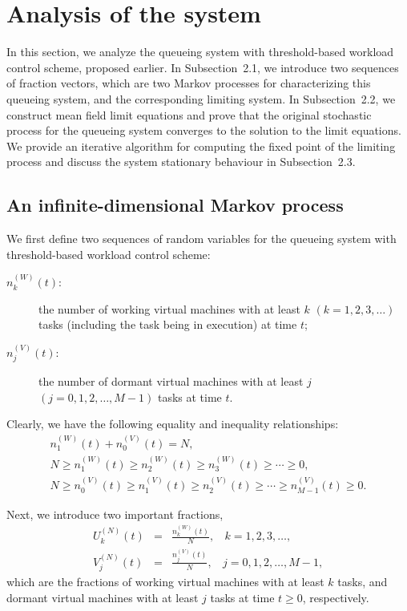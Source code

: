 \documentclass[12pt]{article}
\begin{document}
\section{Analysis of the system}

In this section, we analyze the queueing system with threshold-based workload control scheme, proposed earlier. In Subsection~2.1, we introduce two sequences of fraction vectors, which are two Markov processes for characterizing this queueing system, and the corresponding limiting system. In Subsection~2.2, we construct mean field limit equations and prove that the original stochastic process for the queueing system converges to the solution to the limit equations. We provide an iterative algorithm for computing the fixed point of the limiting process and discuss the system stationary behaviour in Subsection~2.3.


\subsection{An infinite-dimensional Markov process}

We first define two sequences of random variables for the queueing system with threshold-based workload control scheme:
\begin{description}
 \item[$n_k^{(W)}(t)$:] the number of working virtual machines with at least $k$ $(k=1,2,3,\ldots)$ tasks (including the task being in execution) at time $t$;
  \item[$n_j^{(V)}(t)$:] the number of dormant virtual machines with at least $j$ $(j=0,1,2,\ldots, M-1)$ tasks at time $t$.
\end{description}
Clearly, we have the following equality and inequality relationships:
\[\begin{array}{c}
 \displaystyle n_1^{(W)}(t)+n_0^{(V)}(t)=N, \\[4mm]
 \displaystyle N\geq n_1^{(W)}(t)\geq n_2^{(W)}(t)\geq n_3^{(W)}(t)\geq \cdots\geq 0, \\[4mm]
 \displaystyle N\geq n_0^{(V)}(t)\geq n_1^{(V)}(t)\geq n_2^{(V)}(t)\geq \cdots \geq n_{M-1}^{(V)}(t)\geq 0.
\end{array}\]

Next, we introduce two important fractions,
\begin{eqnarray*}
 \displaystyle U^{(N)}_{k}(t) &=& \frac{n_k^{(W)}(t)}{N},~~~~ k=1,2,3,\ldots, \\[4mm]
\displaystyle  V^{(N)}_{j}(t) &=& \frac{n_j^{(V)}(t)}{N},~~~~j=0,1,2,\ldots,M-1,
\end{eqnarray*}
which are the fractions of working virtual machines with at least $k$ tasks, and dormant virtual machines with at least $j$ tasks at time $t\geq0$, respectively.
\end{document}
